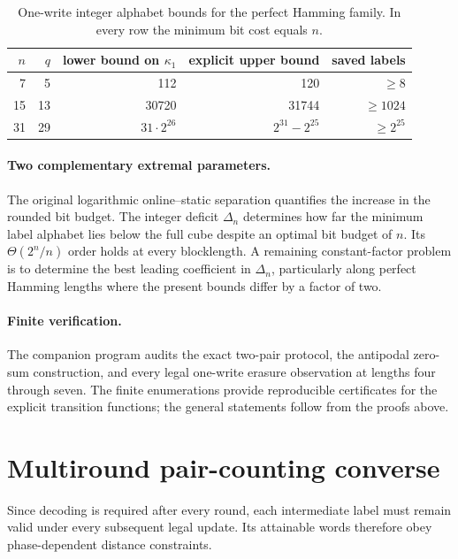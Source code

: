 \documentclass[11pt,a4paper]{article}
\begin{document}
\begin{table}[ht]\centering\small
\begin{tabular}{@{}rrrrr@{}}\toprule
$n$ & $q$ & lower bound on $\kappa_1$ & explicit upper bound & saved labels\\\midrule
7&5&112&120&$\ge8$\\
15&13&30720&31744&$\ge1024$\\
31&29&$31\cdot2^{26}$&$2^{31}-2^{25}$&$\ge2^{25}$\\\bottomrule
\end{tabular}
\caption{One-write integer alphabet bounds for the perfect Hamming family. In every row the minimum bit cost equals $n$.}\label{tab:v3hamming}
\end{table}

\paragraph{Two complementary extremal parameters.}
The original logarithmic online--static separation quantifies the increase in the rounded bit budget. The integer deficit $\Delta_n$ determines how far the minimum label alphabet lies below the full cube despite an optimal bit budget of $n$. Its $\Theta(2^n/n)$ order holds at every blocklength. A remaining constant-factor problem is to determine the best leading coefficient in $\Delta_n$, particularly along perfect Hamming lengths where the present bounds differ by a factor of two.

\paragraph{Finite verification.}
The companion program  audits the exact two-pair protocol, the antipodal zero-sum construction, and every legal one-write erasure observation at lengths four through seven. The finite enumerations provide reproducible certificates for the explicit transition functions; the general statements follow from the proofs above.


\section{Multiround pair-counting converse}\label{sec:saturation}
Since decoding is required after every round, each intermediate label must remain valid under every subsequent legal update. Its attainable words therefore obey phase-dependent distance constraints.
\end{document}
